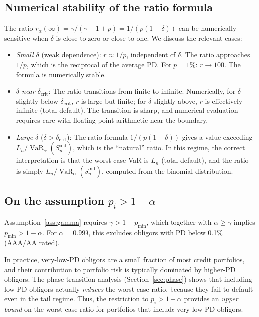 \documentclass[11pt]{article}
\theoremstyle{definition}
\newcommand{\VaR}{\operatorname{VaR}}
\newcommand{\1}{\mathbf{1}}
\begin{document}
\subsection{Numerical stability of the ratio formula}\label{app:stability}

The ratio $r_\alpha(\infty) = \gamma/(\gamma - 1 + \bar{p}) = 1/(p(1-\delta))$ can be numerically sensitive when $\delta$ is close to zero or close to one. We discuss the relevant cases:

\begin{itemize}
  \item \emph{Small $\delta$} (weak dependence): $r \approx 1/p$, independent of $\delta$. The ratio approaches $1/\bar{p}$, which is the reciprocal of the average PD. For $\bar{p} = 1\%$: $r \to 100$. The formula is numerically stable.

  \item \emph{$\delta$ near $\delta_{\mathrm{crit}}$}: The ratio transitions from finite to infinite. Numerically, for $\delta$ slightly below $\delta_{\mathrm{crit}}$, $r$ is large but finite; for $\delta$ slightly above, $r$ is effectively infinite (total default). The transition is sharp, and numerical evaluation requires care with floating-point arithmetic near the boundary.

  \item \emph{Large $\delta$} ($\delta > \delta_{\mathrm{crit}}$): The ratio formula $1/(p(1-\delta))$ gives a value exceeding $L_n / \VaR_\alpha(S_n^{\mathrm{ind}})$, which is the ``natural'' ratio. In this regime, the correct interpretation is that the worst-case VaR is $L_n$ (total default), and the ratio is simply $L_n / \VaR_\alpha(S_n^{\mathrm{ind}})$, computed from the binomial distribution.
\end{itemize}

\subsection{On the assumption $p_i > 1 - \alpha$}\label{app:low_pd}

Assumption~\ref{ass:gamma} requires $\gamma > 1 - p_{\min}$, which together with $\alpha \geq \gamma$ implies $p_{\min} > 1 - \alpha$. For $\alpha = 0.999$, this excludes obligors with PD below 0.1\% (AAA/AA rated).

In practice, very-low-PD obligors are a small fraction of most credit portfolios, and their contribution to portfolio risk is typically dominated by higher-PD obligors. The phase transition analysis (Section~\ref{sec:phase}) shows that including low-PD obligors actually \emph{reduces} the worst-case ratio, because they fail to default even in the tail regime. Thus, the restriction to $p_i > 1 - \alpha$ provides an \emph{upper bound} on the worst-case ratio for portfolios that include very-low-PD obligors.
\end{document}
